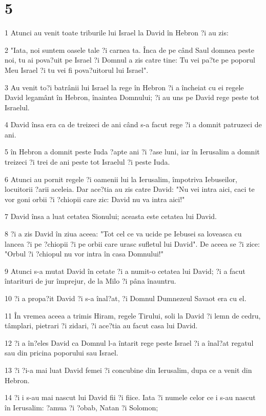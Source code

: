 \chapter{5}

\par 1 Atunci au venit toate triburile lui Israel la David în Hebron ?i au zis:
\par 2 "Iata, noi suntem oasele tale ?i carnea ta. Înca de pe când Saul domnea peste noi, tu ai pova?uit pe Israel ?i Domnul a zis catre tine: Tu vei pa?te pe poporul Meu Israel ?i tu vei fi pova?uitorul lui Israel".
\par 3 Au venit to?i batrânii lui Israel la rege în Hebron ?i a încheiat cu ei regele David legamânt în Hebron, înaintea Domnului; ?i au uns pe David rege peste tot Israelul.
\par 4 David însa era ca de treizeci de ani când s-a facut rege ?i a domnit patruzeci de ani.
\par 5 în Hebron a domnit peste Iuda ?apte ani ?i ?ase luni, iar în Ierusalim a domnit treizeci ?i trei de ani peste tot Israelul ?i peste Iuda.
\par 6 Atunci au pornit regele ?i oamenii lui la Ierusalim, împotriva Iebuseilor, locuitorii ?arii aceleia. Dar ace?tia au zis catre David: "Nu vei intra aici, caci te vor goni orbii ?i ?chiopii care zic: David nu va intra aici!"
\par 7 David însa a luat cetatea Sionului; aceasta este cetatea lui David.
\par 8 ?i a zis David în ziua aceea: "Tot cel ce va ucide pe Iebusei sa loveasca cu lancea ?i pe ?chiopii ?i pe orbii care urasc sufletul lui David". De aceea se ?i zice: "Orbul ?i ?chiopul nu vor intra în casa Domnului!"
\par 9 Atunci s-a mutat David în cetate ?i a numit-o cetatea lui David; ?i a facut întarituri de jur împrejur, de la Milo ?i pâna înauntru.
\par 10 ?i a propa?it David ?i s-a înal?at, ?i Domnul Dumnezeul Savaot era cu el.
\par 11 În vremea aceea a trimis Hiram, regele Tirului, soli la David ?i lemn de cedru, tâmplari, pietrari ?i zidari, ?i ace?tia au facut casa lui David.
\par 12 ?i a în?eles David ca Domnul l-a întarit rege peste Israel ?i a înal?at regatul sau din pricina poporului sau Israel.
\par 13 ?i ?i-a mai luat David femei ?i concubine din Ierusalim, dupa ce a venit din Hebron.
\par 14 ?i i s-au mai nascut lui David fii ?i fiice. Iata ?i numele celor ce i s-au nascut în Ierusalim: ?amua ?i ?obab, Natan ?i Solomon;
